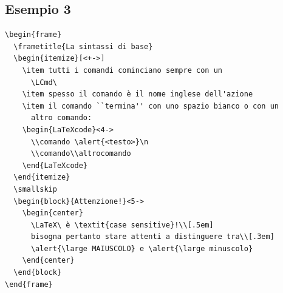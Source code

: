 \documentclass[a4paper,10pt]{article}
\begin{document}
\newpage 
\subsection*{Esempio 3}\label{ex3}
\begin{Verbatim}
\begin{frame}
  \frametitle{La sintassi di base}
  \begin{itemize}[<+->]
    \item tutti i comandi cominciano sempre con un
      \LCmd\
    \item spesso il comando è il nome inglese dell'azione
    \item il comando ``termina'' con uno spazio bianco o con un
      altro comando:
    \begin{LaTeXcode}<4->
      \\comando \alert{<testo>}\n
      \\comando\\altrocomando
    \end{LaTeXcode}
  \end{itemize}
  \smallskip
  \begin{block}{Attenzione!}<5->
    \begin{center}
      \LaTeX\ è \textit{case sensitive}!\\[.5em]
      bisogna pertanto stare attenti a distinguere tra\\[.3em]
      \alert{\large MAIUSCOLO} e \alert{\large minuscolo}
    \end{center}
  \end{block}
\end{frame}
\end{Verbatim}

\bigskip
\begin{center}
\end{center}
\end{document}
